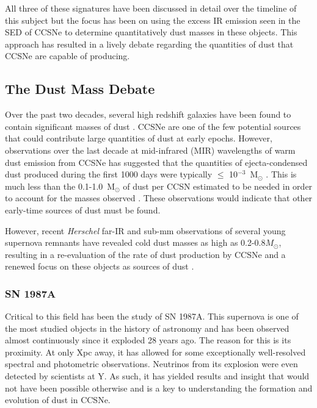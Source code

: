 \noindent All three of these signatures have been discussed in detail over the timeline of this subject but the focus has been on using the excess IR emission seen in the SED of CCSNe to determine quantitatively dust masses in these objects.  This approach has resulted in a lively debate regarding the quantities of dust that CCSNe are capable of producing.
 
\subsection{The Dust Mass Debate}

Over the past two decades, several high redshift galaxies  have been found to contain significant masses of dust \citep{Omont2001, Bertoldi2003, Watson2015}.  CCSNe are one of the few potential sources that could contribute large quantities of dust at early epochs. However, 
observations over the last decade at mid-infrared (MIR) wavelengths of 
warm dust emission from CCSNe has suggested that the quantities of ejecta-condensed dust 
produced during the first 1000 days were typically $\leq$ 10$^{-3}$~M$_\odot$  
\citep{Sugerman2006, Meikle2007, Kotak2009, Andrews2010, Fabbri2011}.  This is much less than the 0.1-1.0~M$_\odot$ of dust per CCSN  
estimated to be needed  in order to account for the masses observed \citep{Morgan2003, Dwek2007}.  These observations would indicate that other early-time sources of dust must be found.

 However, recent {\em Herschel} far-IR and sub-mm observations of  several young supernova remnants have revealed cold dust  masses as high as 
0.2-0.8$M_{\odot}$, resulting in a 
re-evaluation of the rate of dust production by CCSNe and a renewed focus on these objects as sources of dust \citep{Barlow2010, 
Matsuura2011, Gomez2012}.

\subsubsection{SN 1987A}



Critical to this field has been the study of SN 1987A.   This supernova is one of the most studied objects in the history of astronomy and has been observed almost continuously since it exploded 28 years ago.  The reason for this is its proximity.  At only Xpc away, it has allowed for some exceptionally well-resolved spectral and photometric observations.  Neutrinos from its explosion were even detected by scientists at Y.  As such, it has yielded results and insight that would not have been possible otherwise and is a key to understanding the formation and evolution of dust in CCSNe.

